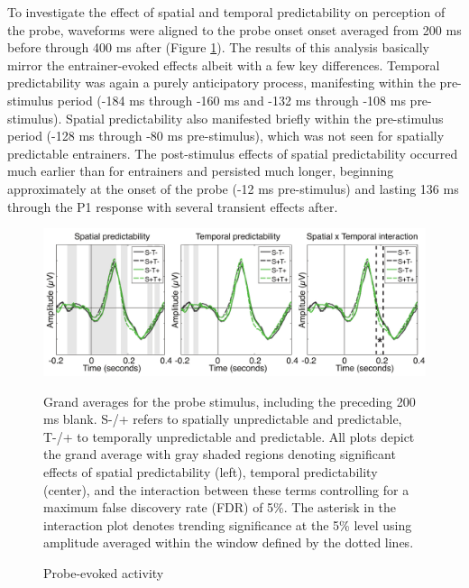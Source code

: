 \documentclass[dwyatte_dissertation.tex]{subfiles}
\begin{document}
To investigate the effect of spatial and temporal predictability on perception of the probe, waveforms were aligned to the probe onset onset averaged from 200 ms before through 400 ms after (Figure \ref{fig:probe_tla}). The results of this analysis basically mirror the entrainer-evoked effects albeit with a few key differences. Temporal predictability was again a purely anticipatory process, manifesting within the pre-stimulus period (-184 ms through -160 ms and -132 ms through -108 ms pre-stimulus). Spatial predictability also manifested briefly within the pre-stimulus period (-128 ms through -80 ms pre-stimulus), which was not seen for spatially predictable entrainers. The post-stimulus effects of spatial predictability occurred much earlier than for entrainers and persisted much longer, beginning approximately at the onset of the probe (-12 ms pre-stimulus) and lasting 136 ms through the P1 response with several transient effects after.

\begin{figure}[h!]
\begin{center}
\includegraphics[width=160mm]{figs/pleast/results_probe_tla_All_montage.pdf}
\end{center}
\caption{Probe-evoked activity}{Grand averages for the probe stimulus, including the preceding 200 ms blank. S-/+ refers to spatially unpredictable and predictable, T-/+ to temporally unpredictable and predictable. All plots depict the grand average with gray shaded regions denoting significant effects of spatial predictability (left), temporal predictability (center), and the interaction between these terms controlling for a maximum false discovery rate (FDR) of 5\%. The asterisk in the interaction plot denotes trending significance at the 5\% level using amplitude averaged within the window defined by the dotted lines.}
\label{fig:probe_tla}
\end{figure}
\end{document}
